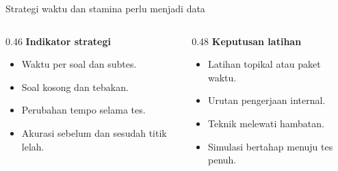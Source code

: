 \begin{frame}{Strategi waktu dan stamina perlu menjadi data}
  \begin{columns}[T,onlytextwidth]
    \begin{column}{0.46\textwidth}
      {\color{StudentBlue}\bfseries Indikator strategi}\par
      \begin{itemize}
        \item Waktu per soal dan subtes.
        \item Soal kosong dan tebakan.
        \item Perubahan tempo selama tes.
        \item Akurasi sebelum dan sesudah titik lelah.
      \end{itemize}
    \end{column}
    \begin{column}{0.48\textwidth}
      {\color{StudentBlue}\bfseries Keputusan latihan}\par
      \begin{itemize}
        \item Latihan topikal atau paket waktu.
        \item Urutan pengerjaan internal.
        \item Teknik melewati hambatan.
        \item Simulasi bertahap menuju tes penuh.
      \end{itemize}
    \end{column}
  \end{columns}
  \vspace{0.15cm}
\end{frame}

